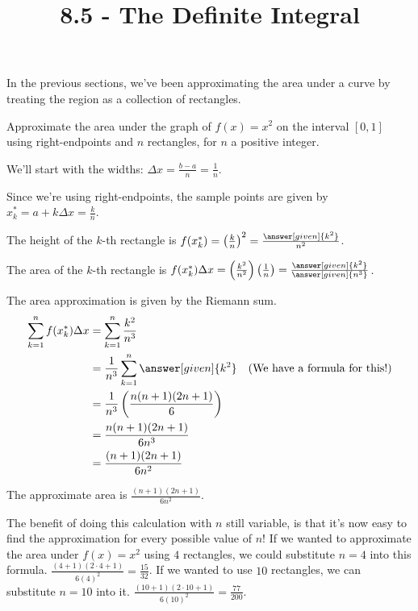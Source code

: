 \documentclass{ximera}
\title{8.5 - The Definite Integral}
\begin{document}
\begin{abstract}
\end{abstract}
\maketitle


In the previous sections, we've been approximating the area under a curve by treating the region as a collection of
rectangles.

\begin{example}
	Approximate the area under the graph of $f(x)=x^2$ on the interval $[0,1]$ using right-endpoints and $n$ rectangles, for $n$ a positive integer.
	\begin{explanation}
		We'll start with the widths: $\Delta x = \frac{b-a}{n} = \frac{1}{n}$.
		
		Since we're using right-endpoints, the sample points are given by $x_k^* = a + k \Delta x = \frac{k}{n}$.
		
		The height of the $k$-th rectangle is $f(x_k^*) = \left( \frac{k}{n} \right)^2 = \frac{\answer[given]{k^2}}{n^2}$.
		
		The area of the $k$-th rectangle is $f(x_k^*)\Delta x = \left(\frac{k^2}{n^2}\right)\left( \frac{1}{n} \right) = \frac{\answer[given]{k^2}}{\answer[given]{n^3}}$.
		
		The area approximation is given by the Riemann sum.
		\begin{align*}
			\sum_{k=1}^{n} f(x_k^*) \Delta x &= \sum_{k=1}^n \frac{k^2}{n^3}\\
				&= \frac{1}{n^3} \sum_{k=1}^{n} \answer[given]{k^2} \quad \text{(We have a formula for this!)}\\
				&= \frac{1}{n^3} \left( \frac{n(n+1)(2n+1)}{6}\right)\\
				&= \frac{n(n+1)(2n+1)}{6n^3}\\
				&= \frac{(n+1)(2n+1)}{6n^2}
		\end{align*}

		The approximate area is $\frac{(n+1)(2n+1)}{6n^2}$.
	\end{explanation}
\end{example}

The benefit of doing this calculation with $n$ still variable, is that it's now easy to find the approximation for every possible value of $n$!
If we wanted to approximate the area under $f(x)=x^2$ using $4$ rectangles, we could substitute $n=4$ into this formula.
$\frac{(4+1)(2\cdot4+1)}{6(4)^2} = \frac{15}{32}$.  If we wanted to use $10$ rectangles, we can substitute $n=10$ into it.
$\frac{(10+1)(2\cdot 10+1)}{6(10)^2} = \frac{77}{200}$.
\end{document}
